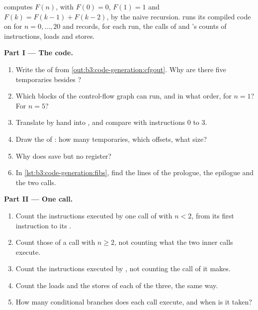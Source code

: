 \begin{problem}\label{pb:b3:code-generation:1}
 computes $F(n)$, with $F(0) = 0$, $F(1) = 1$ and $F(k) = F(k-1) + F(k-2)$, by the naive recursion.  runs its compiled code on  for $n = 0, \dots, 20$ and records, for each run, the calls of  and 's counts of instructions, loads and stores.

\label{out:b3:code-generation:pbfib}

\medskip\noindent\textbf{Part I --- The code.}
\begin{enumerate}
\item Write the  of  from \cref{out:b3:code-generation:cfgout}. Why are there five temporaries besides ?
\item Which blocks of the control-flow graph can run, and in what order, for $n = 1$? For $n = 5$?
\item Translate  by hand into , and compare with instructions 0 to 3.
\item Draw the  of : how many temporaries, which offsets, what size?
\item Why does  save  but no  register?
\item In \cref{lst:b3:code-generation:fibs}, find the lines of the prologue, the epilogue and the two calls.
\end{enumerate}

\medskip\noindent\textbf{Part II --- One call.}
\begin{enumerate}[resume]
\item Count the instructions executed by one call of  with $n < 2$, from its first instruction to its .
\item Count those of a call with $n \ge 2$, not counting what the two inner calls execute.
\item Count the instructions executed by , not counting the call of  it makes.
\item Count the loads and the stores of each of the three, the same way.
\item How many conditional branches does each call execute, and when is it taken?
\end{enumerate}


\end{problem}
